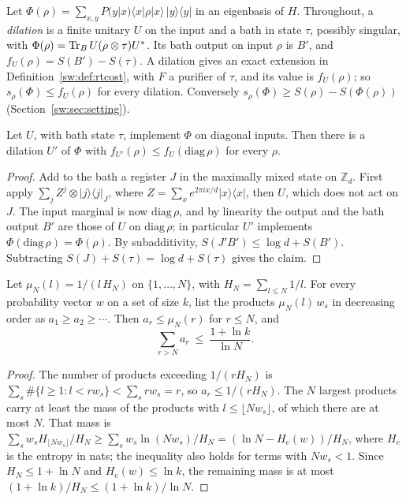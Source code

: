 Let $\Phi(\rho)=\sum_{x,y}P(y|x)\langle x|\rho|x\rangle\,|y\rangle\langle y|$ in an eigenbasis of $H$. Throughout, a \emph{dilation} is a finite unitary $U$ on the input and a bath in state $\tau$, possibly singular, with $\Phi(\rho)=\operatorname{Tr}_BU(\rho\otimes\tau)U^*$. Its bath output on input $\rho$ is $B'$, and $f_U(\rho)=S(B')-S(\tau)$. A dilation gives an exact extension in Definition~\ref{sw:def:rtcost}, with $F$ a purifier of $\tau$, and its value is $f_U(\rho)$; so $s_\rho(\Phi)\le f_U(\rho)$ for every dilation. Conversely $s_\rho(\Phi)\ge S(\rho)-S(\Phi(\rho))$ (Section~\ref{sw:sec:setting}).

\begin{lemma}\label{sw:lem:dephase}
Let $U$, with bath state $\tau$, implement $\Phi$ on diagonal inputs. Then there is a dilation $U'$ of $\Phi$ with $f_{U'}(\rho)\le f_U(\mathrm{diag}\,\rho)$ for every $\rho$.
\end{lemma}

\begin{proof}
Add to the bath a register $J$ in the maximally mixed state on $\mathbb Z_d$. First apply $\sum_j Z^j\otimes|j\rangle\langle j|_J$, where $Z=\sum_x e^{2\pi ix/d}|x\rangle\langle x|$, then $U$, which does not act on $J$. The input marginal is now $\mathrm{diag}\,\rho$, and by linearity the output and the bath output $B'$ are those of $U$ on $\mathrm{diag}\,\rho$; in particular $U'$ implements $\Phi(\mathrm{diag}\,\rho)=\Phi(\rho)$. By subadditivity, $S(J'B')\le\log d+S(B')$. Subtracting $S(J)+S(\tau)=\log d+S(\tau)$ gives the claim.
\end{proof}

\begin{lemma}\label{sw:lem:loguniform}
Let $\mu_N(l)=1/(l\,H_N)$ on $\{1,\dots,N\}$, with $H_N=\sum_{l\le N}1/l$. For every probability vector $w$ on a set of size $k$, list the products $\mu_N(l)\,w_s$ in decreasing order as $a_1\ge a_2\ge\cdots$. Then $a_r\le\mu_N(r)$ for $r\le N$, and
\[
\sum_{r>N}a_r\ \le\ \frac{1+\ln k}{\ln N}.
\]
\end{lemma}

\begin{proof}
The number of products exceeding $1/(rH_N)$ is $\sum_s\#\{l\ge1:l<rw_s\}<\sum_s rw_s=r$, so $a_r\le1/(rH_N)$. The $N$ largest products carry at least the mass of the products with $l\le\lfloor Nw_s\rfloor$, of which there are at most $N$. That mass is $\sum_sw_sH_{\lfloor Nw_s\rfloor}/H_N\ge\sum_sw_s\ln(Nw_s)/H_N=(\ln N-H_e(w))/H_N$, where $H_e$ is the entropy in nats; the inequality also holds for terms with $Nw_s<1$. Since $H_N\le1+\ln N$ and $H_e(w)\le\ln k$, the remaining mass is at most $(1+\ln k)/H_N\le(1+\ln k)/\ln N$.
\end{proof}

